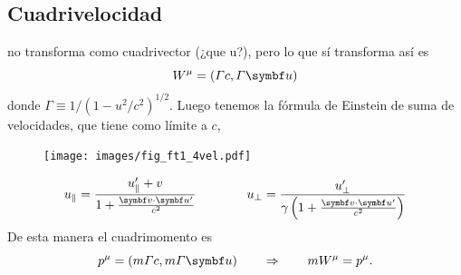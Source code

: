 \documentclass[10pt,oneside]{CBFT_book}
\begin{document}
\subsection{Cuadrivelocidad}

 no transforma como cuadrivector (¿que u?), pero lo que sí transforma así es
\[
	W^\mu = ( \Gamma c , \Gamma \vb{u} ) 
\]
donde $ \Gamma \equiv 1/( 1 - u^2/c^2)^{1/2}$. Luego tenemos la fórmula de Einstein de suma de velocidades,
que tiene como límite a $c$,

\begin{figure}[htb]
	\begin{center}
	\texttt{[image: images/fig\_ft1\_4vel.pdf]}	 
	\end{center}
	\caption{}
\end{figure} 

\[
	u_\parallel = \frac{ u'_\parallel + v}{ 1 + \frac{\pe{v}{u'}}{c^2} } \qquad \qquad 
	u_\perp = \frac{ u'_\perp}{\gamma\left(1 + \frac{\pe{v}{u'}}{c^2}\right)}
\]
De esta manera el cuadrimomento es 
\[
	p^\mu = ( m\Gamma c, m \Gamma \vb{u}) \qquad \Rightarrow \qquad m W^\mu = p^\mu.
\]

\end{document}
